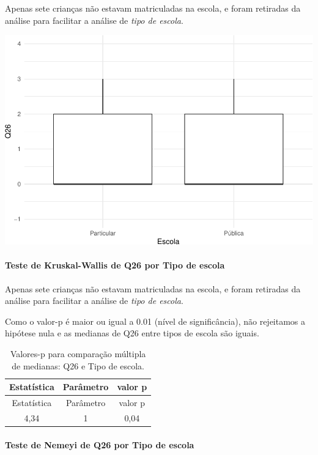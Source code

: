 \documentclass[]{article}
\let\oldparagraph\paragraph
\renewcommand{\paragraph}[1]{\oldparagraph{#1}\mbox{}}
\begin{document}
Apenas sete crianças não estavam matriculadas na escola, e foram retiradas da análise para facilitar a análise de \emph{tipo de escola}.

\begin{center}\includegraphics[width=0.75\linewidth]{relatorio_covid19_files/figure-latex/unnamed-chunk-765-1} \end{center}

\hypertarget{teste-de-kruskal-wallis-de-q26-por-tipo-de-escola}{%
\paragraph{Teste de Kruskal-Wallis de Q26 por Tipo de escola}\label{teste-de-kruskal-wallis-de-q26-por-tipo-de-escola}}

Apenas sete crianças não estavam matriculadas na escola, e foram retiradas da análise para facilitar a análise de \emph{tipo de escola}.

Como o valor-p é maior ou igual a 0.01 (nível de significância), não rejeitamos a hipótese nula e as medianas de Q26 entre tipos de escola são iguais.

\begin{longtable}[]{@{}ccc@{}}
\caption{\label{tab:unnamed-chunk-767}Valores-p para comparação múltipla de medianas: Q26 e Tipo de escola.}\tabularnewline
\toprule
Estatística & Parâmetro & valor p\tabularnewline
\midrule
\endfirsthead
\toprule
Estatística & Parâmetro & valor p\tabularnewline
\midrule
\endhead
4,34 & 1 & 0,04\tabularnewline
\bottomrule
\end{longtable}

\hypertarget{teste-de-nemeyi-de-q26-por-tipo-de-escola}{%
\paragraph{Teste de Nemeyi de Q26 por Tipo de escola}\label{teste-de-nemeyi-de-q26-por-tipo-de-escola}}
\end{document}
